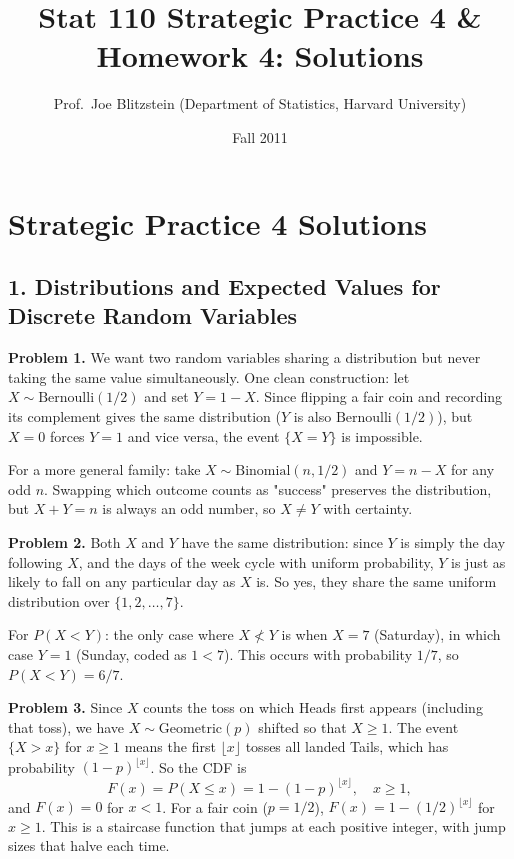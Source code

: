 \documentclass{article}
\title{Stat 110 Strategic Practice 4 \& Homework 4: Solutions}
\author{Prof.\ Joe Blitzstein (Department of Statistics, Harvard University)}
\date{Fall 2011}
\begin{document}
\maketitle

\section*{Strategic Practice 4 Solutions}

\subsection*{1. Distributions and Expected Values for Discrete Random Variables}

\textbf{Problem 1.} We want two random variables sharing a distribution but never taking the same value simultaneously. One clean construction: let $X\sim\text{Bernoulli}(1/2)$ and set $Y=1-X$. Since flipping a fair coin and recording its complement gives the same distribution ($Y$ is also $\text{Bernoulli}(1/2)$), but $X=0$ forces $Y=1$ and vice versa, the event $\{X=Y\}$ is impossible.

For a more general family: take $X\sim\text{Binomial}(n,1/2)$ and $Y=n-X$ for any odd $n$. Swapping which outcome counts as "success" preserves the distribution, but $X+Y=n$ is always an odd number, so $X\ne Y$ with certainty.

\bigskip
\textbf{Problem 2.} Both $X$ and $Y$ have the same distribution: since $Y$ is simply the day following $X$, and the days of the week cycle with uniform probability, $Y$ is just as likely to fall on any particular day as $X$ is. So yes, they share the same uniform distribution over $\{1,2,\dots,7\}$.

For $P(X<Y)$: the only case where $X\not<Y$ is when $X=7$ (Saturday), in which case $Y=1$ (Sunday, coded as $1<7$). This occurs with probability $1/7$, so $P(X<Y)=6/7$.

\bigskip
\textbf{Problem 3.} Since $X$ counts the toss on which Heads first appears (including that toss), we have $X\sim\text{Geometric}(p)$ shifted so that $X\ge1$. The event $\{X>x\}$ for $x\ge1$ means the first $\lfloor x\rfloor$ tosses all landed Tails, which has probability $(1-p)^{\lfloor x\rfloor}$. So the CDF is
$$
F(x) = P(X\le x) = 1-(1-p)^{\lfloor x\rfloor}, \quad x\ge 1,
$$
and $F(x)=0$ for $x<1$. For a fair coin ($p=1/2$), $F(x)=1-(1/2)^{\lfloor x\rfloor}$ for $x\ge1$. This is a staircase function that jumps at each positive integer, with jump sizes that halve each time.
\end{document}
